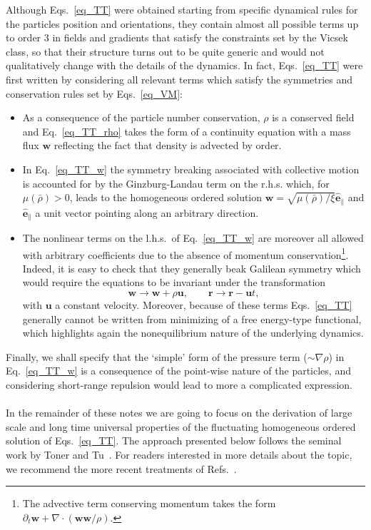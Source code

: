 Although Eqs.~\eqref{eq_TT} were obtained starting from specific dynamical rules for the particles position and orientations, 
they contain almost all possible terms up to order 3 in fields and gradients that satisfy the constraints set by the Vicsek class,
so that their structure turns out to be quite generic and would not qualitatively change with the details of the dynamics.
In fact, Eqs.~\eqref{eq_TT} were first written by considering all relevant terms which satisfy the symmetries and conservation rules 
set by Eqs.~\eqref{eq_VM}:
\begin{itemize}
\item As a consequence of the particle number conservation, $\rho$ is a conserved field and Eq.~\eqref{eq_TT_rho} takes the form of a continuity equation with a mass flux $\bm w$ reflecting the fact that density is advected by order.
\item In Eq.~\eqref{eq_TT_w} the symmetry breaking associated with collective motion is accounted for by the Ginzburg-Landau term on the r.h.s. which, for $\mu(\bar{\rho}) > 0$, leads to the homogeneous ordered solution $\bm w = \sqrt{\mu(\bar{\rho}) / \xi} \hat{\bm e}_\|$ and $\hat{\bm e}_\|$ a unit vector pointing along an arbitrary direction.
\item The nonlinear terms on the l.h.s.\ of Eq.~\eqref{eq_TT_w} are moreover all allowed with arbitrary coefficients due to the absence 
of momentum conservation\footnote{The advective term conserving momentum takes the form $\partial_t \bm w + \nabla \cdot (\bm w \bm w / \rho)$.}. 
Indeed, it is easy to check that they generally beak Galilean symmetry which would require the equations to be invariant under the transformation
\begin{equation*}
\bm w \to \bm w + \rho \bm u , \qquad \bm r \to \bm r - \bm u t ,
\end{equation*}
with $\bm u$ a constant velocity.
Moreover, because of these terms Eqs.~\eqref{eq_TT} generally cannot be written from minimizing of a free energy-type functional,
which highlights again the nonequilibrium nature of the underlying dynamics.
\end{itemize}
Finally, we shall specify that the `simple' form of the pressure term ($\sim \nabla\rho$) in Eq.~\eqref{eq_TT_w} is a consequence of the point-wise nature of the particles, 
and considering short-range repulsion would lead to more a complicated expression. \\
\\
In the remainder of these notes we are going to focus on the derivation of large scale and long time universal properties of the fluctuating homogeneous ordered solution of Eqs.~\eqref{eq_TT}.
The approach presented below follows the seminal work by Toner and Tu~\cite{toner1995long,toner1998flocks}.
For readers interested in more details about the topic, we recommend the more recent treatments of Refs.~\cite{toner2012reanalysis,tonerlecture2018}.

